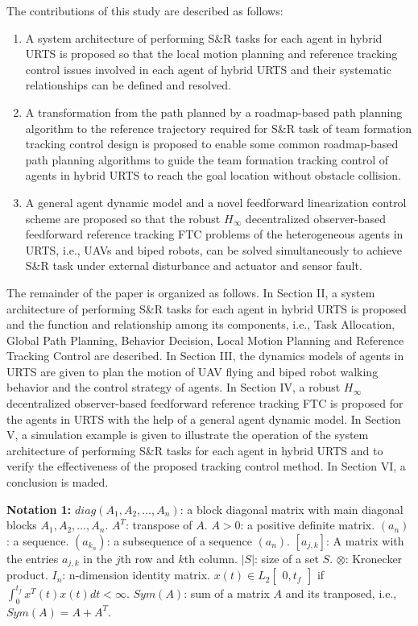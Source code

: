 \documentclass{ieeeaccess}
\begin{document}
The contributions of this study are described as follows:
\begin{enumerate}
    \item A system architecture of performing S\&R tasks for each agent in hybrid URTS is proposed so that the local motion planning and reference tracking control issues involved in each agent of hybrid URTS and their systematic relationships can be defined and resolved.
    \item A transformation from the path planned by a roadmap-based path planning algorithm to the reference trajectory required for S\&R task of team formation tracking control design is proposed to enable some common roadmap-based path planning algorithms to guide the team formation tracking control of agents in hybrid URTS to reach the goal location without obstacle collision.
    \item A general agent dynamic model and a novel feedforward linearization control scheme are proposed so that the robust $H_\infty$ decentralized observer-based feedforward reference tracking FTC problems of the heterogeneous agents in URTS, i.e., UAVs and biped robots, can be solved simultaneously to achieve S\&R task under external disturbance and actuator and sensor fault.
\end{enumerate}

The remainder of the paper is organized as follows. In Section II, a system architecture of performing S\&R tasks for each agent in hybrid URTS is proposed and the function and relationship among its components, i.e., Task Allocation, Global Path Planning, Behavior Decision, Local Motion Planning and Reference Tracking Control are described. In Section III, the dynamics models of agents in URTS are given to plan the motion of UAV flying and biped robot walking behavior and the control strategy of agents. In Section IV, a robust $H_\infty$ decentralized observer-based feedforward reference tracking FTC is proposed for the agents in URTS with the help of a general agent dynamic model. In Section V, a simulation example is given to illustrate the operation of the system architecture of performing S\&R tasks for each agent in hybrid URTS and to verify the effectiveness of the proposed tracking control method. In Section VI, a conclusion is maded.

\textbf{Notation 1:} 
$diag(A_1, A_2, \dots, A_n)$: a block diagonal matrix with main diagonal blocks $A_1, A_2, \dots, A_n$. $A^T$: transpose of $A$. $A > 0$: a positive definite matrix. $(a_n)$: a sequence. $(a_{k_n})$: a subsequence of a sequence $(a_n)$. $[a_{j,k}]$: A matrix with the entries $a_{j,k}$ in the $j$th row and $k$th column. $\vert{S}\vert$: size of a set $S$. $\otimes$: Kronecker product. $I_n$: n-dimension identity matrix. $x(t)\in L_2\begin{bmatrix}
    0,t_f 
\end{bmatrix}$ if $\int^{t_f}_{0}x^T(t)x(t)dt<\infty$. $Sym(A)$: sum of a matrix $A$ and its tranposed, i.e., $Sym(A) = A+A^T$.
\end{document}
